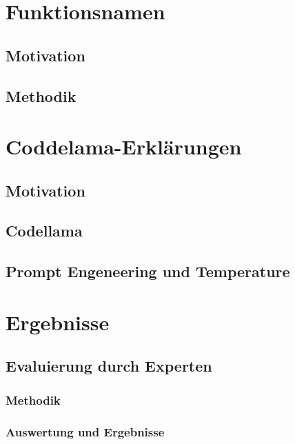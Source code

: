 \documentclass[12pt,letterpaper,ngerman]{article}
\begin{document}
\section{Funktionsnamen}
\subsection{Motivation}
\subsection{Methodik}
\section{Coddelama-Erklärungen}
\subsection{Motivation}
\subsection{Codellama} 
\subsection{Prompt Engeneering und Temperature}
\section{Ergebnisse}
\subsection{Evaluierung durch Experten}
\subsubsection{Methodik}
\subsubsection{Auswertung und Ergebnisse}
\end{document}
